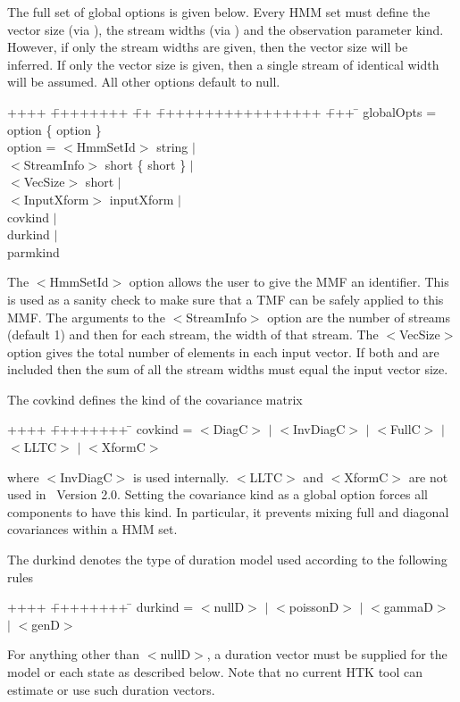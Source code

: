 The full set of global options is given below.  Every HMM set must
define the vector size (via ), the stream widths  
(via )
and the observation parameter kind.  However, if only the stream
widths are given, then the vector size will be inferred.  If
only the vector size is given, then a single stream of identical
width will be assumed.  All other options default to null.
{\sf
\begin{tabbing}
++++ \= ++++++++ \= ++ \= +++++++++++++++++ \= +++ \=  \kill
\> globalOpts = \> option \{ option \} \\
\>  option = \> $<$HmmSetId$>$ string $|$ \\ 
\>\>  $<$StreamInfo$>$ short \{ short \} $|$  \\
\>\>   $<$VecSize$>$    short $|$  \\
\>\>   $<$InputXform$>$ inputXform $|$  \\
\>\>   covkind $|$ \\
\>\>   durkind $|$ \\
\>\>   parmkind 
\end{tabbing}
}
\noindent
The {\sf $<$HmmSetId$>$} option allows the user to give the MMF an
identifier. This is used as a sanity check to make sure that a TMF can
be safely applied to this MMF.
The arguments to the
{\sf $<$StreamInfo$>$} option are the number of streams (default 1) and then
for each stream, the width of that stream.  The {\sf $<$VecSize$>$} option 
gives the total number of elements in each input vector.  
If both  and  are included then the
sum of all the stream widths must equal the input vector size.

The {\sf covkind } defines the kind of the covariance matrix
{\sf
\begin{tabbing}
++++ \= ++++++++ \=  \kill
\>  covkind =\> $<$DiagC$>$ $|$ $<$InvDiagC$>$ $|$ $<$FullC$>$ $|$ \\
\>\>            $<$LLTC$>$ $|$ $<$XformC$>$ 
\end{tabbing}
}
\noindent
where {\sf $<$InvDiagC$>$} is used internally.  {\sf $<$LLTC$>$}
and {\sf $<$XformC$>$} are not used in \HTK\ Version 2.0.
Setting the covariance kind as a global option forces all components to
have this kind.  In particular, it prevents mixing full and diagonal covariances
within a HMM set.

The {\sf durkind} denotes the type of duration
model used according to the following rules
{\sf
\begin{tabbing}
++++ \= ++++++++ \=  \kill
\>  durkind =\> $<$nullD$>$ $|$ $<$poissonD$>$ $|$ $<$gammaD$>$ $|$ $<$genD$>$ 
\end{tabbing}
}
\noindent
For anything other than {\sf $<$nullD$>$}, a duration vector must
be supplied for the model or each state as described below. Note that no
current HTK tool can estimate or use such duration vectors.  

